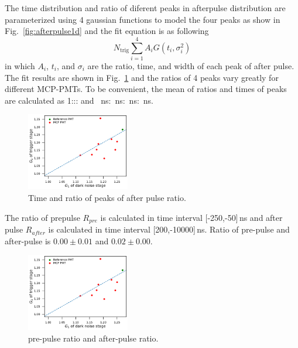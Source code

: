 The time distribution and ratio of diferent peaks in afterpulse distribution are parameterized using 4 gaussian functions to model the four peaks as show in Fig.~\ref{fig:afterpulse1d} and the fit equation is as following
\begin{equation}
    N_{\mathrm{trig}}\sum_{i=1}^{4}{A_iG(t_i,\sigma_i^2)}
\end{equation}
in which $A_i$, $t_i$, and $\sigma_i$ are the ratio, time, and width of each peak of after pulse. The fit results are shown in Fig.~\ref{fig:afterpulsePeak} and the ratios of 4 peaks vary greatly for different MCP-PMTs. To be convenient, the mean of ratios and times of peaks are calculated as 1::: and \SI{}{ns}:\SI{}{ns}:\SI{}{ns}:\SI{}{ns}.
\begin{figure}[!htbp]
    \centering
    \includegraphics[width=0.4\textwidth,page=13]{figures/result/compare.pdf}
    \caption{Time and ratio of peaks of after pulse ratio.}
    \label{fig:afterpulsePeak}
\end{figure}

The ratio of prepulse $R_{pre}$ is calculated in time interval [-250,-50]\,ns and after pulse $R_{after}$ is calculated in time interval [200,-10000]\,ns. Ratio of pre-pulse and after-pulse is $0.00\pm0.01$ and $0.02\pm0.00$.
\begin{figure}[!htbp]
    \centering
    \includegraphics[width=0.4\textwidth,page=11]{figures/result/compare.pdf}
    \caption{pre-pulse ratio and after-pulse ratio.}
    \label{fig:prepulseCompare}
\end{figure}

